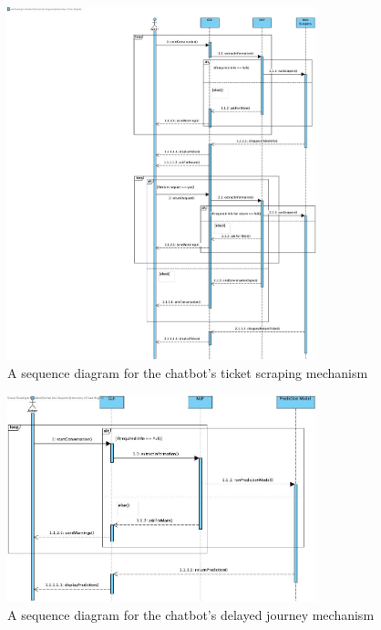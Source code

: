 \begin{figure}[!htbp]
    \centering
    \includegraphics[trim= 350 0 0 0,width= 0.8\textwidth]{Diagrams/ata_diags/Sequence Diagram of Part-1.jpg}
    \caption{A sequence diagram for the chatbot's ticket scraping mechanism}
    \label{Fig: seq diag ticket scraping}
\end{figure}

\begin{figure}[!htbp]
    \centering
    \includegraphics[width= 0.8\textwidth]{Diagrams/ata_diags/Sequence Diagram of Part-2.jpg}
    \caption{A sequence diagram for the chatbot's delayed journey mechanism}
    \label{Fig: seq diag delay prediction}
\end{figure}

